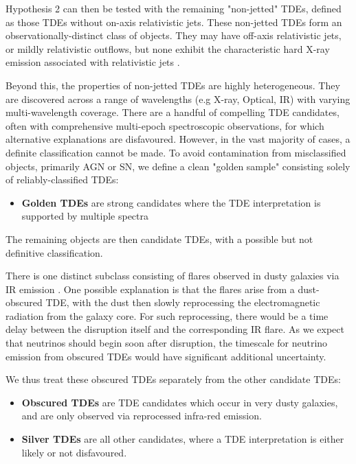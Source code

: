 Hypothesis 2 can then be tested with the remaining "non-jetted" TDEs, defined as those TDEs without on-axis relativistic jets. These non-jetted TDEs form an observationally-distinct class of objects. They may have off-axis relativistic jets, or mildly relativistic outflows, but none exhibit the characteristic hard X-ray emission associated with relativistic jets .

Beyond this, the properties of non-jetted TDEs are highly heterogeneous. They are discovered across a range of wavelengths (e.g X-ray, Optical, IR) with varying multi-wavelength coverage. There are a handful of compelling TDE candidates, often with comprehensive multi-epoch spectroscopic observations, for which alternative explanations are disfavoured. However, in the vast majority of cases, a definite classification cannot be made. To avoid contamination from misclassified objects, primarily AGN or SN, we define a clean "golden sample" consisting solely of reliably-classified TDEs:

\begin{itemize}
	\item \textbf{Golden TDEs} are strong candidates where the TDE interpretation is supported by multiple spectra
\end{itemize}

The remaining objects are then candidate TDEs, with a possible but not definitive classification. 

There is one distinct subclass consisting of flares observed in dusty galaxies via IR emission . One possible explanation is that the flares arise from a dust-obscured TDE, with the dust then slowly reprocessing the electromagnetic radiation from the galaxy core.  For such reprocessing, there would be a time delay between the disruption itself and the corresponding IR flare. As we expect that neutrinos should begin soon after disruption, the timescale for neutrino emission from obscured TDEs would have significant additional uncertainty. 

We thus treat these obscured TDEs separately from the other candidate TDEs:

\begin{itemize}
		\item \textbf{Obscured TDEs} are TDE candidates which occur in very dusty galaxies, and are only observed via reprocessed infra-red emission. 
	\item \textbf{Silver TDEs} are all other candidates, where a TDE interpretation is either likely or not disfavoured.
\end{itemize}

